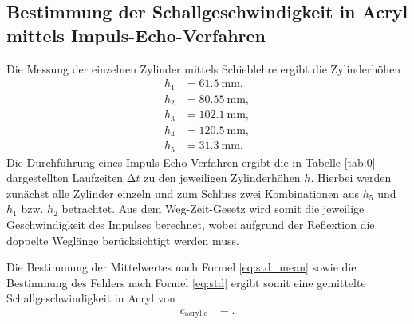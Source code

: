 \subsection{Bestimmung der Schallgeschwindigkeit in Acryl mittels Impuls-Echo-Verfahren}
Die Messung der einzelnen Zylinder mittels Schieblehre ergibt die Zylinderhöhen
\begin{align*}
  h_1 &= \SI{61.5}{\milli\metre}, \\
  h_2 &= \SI{80.55}{\milli\metre}, \\
  h_3 &= \SI{102.1}{\milli\metre}, \\
  h_4 &= \SI{120.5}{\milli\metre}, \\
  h_5 &= \SI{31.3}{\milli\metre}.
\end{align*}
Die Durchführung eines Impuls-Echo-Verfahren ergibt die in Tabelle \ref{tab:0} dargestellten Laufzeiten $\increment t$ zu den jeweiligen Zylinderhöhen $h$.
Hierbei werden zunächst alle Zylinder einzeln und zum Schluss zwei Kombinationen aus $h_5$ und $h_1$ bzw. $h_2$ betrachtet.
Aus dem Weg-Zeit-Gesetz wird somit die jeweilige Geschwindigkeit des Impulses berechnet, wobei aufgrund der Reflextion die doppelte Weglänge berücksichtigt werden muss.
  
Die Bestimmung der Mittelwertes nach Formel \eqref{eq:std_mean} sowie die Bestimmung des Fehlers nach Formel \eqref{eq:std} ergibt somit eine gemittelte Schallgeschwindigkeit in Acryl von
\begin{align*}
  c_{\text{acryl,e}} &= .\\
\end{align*}

